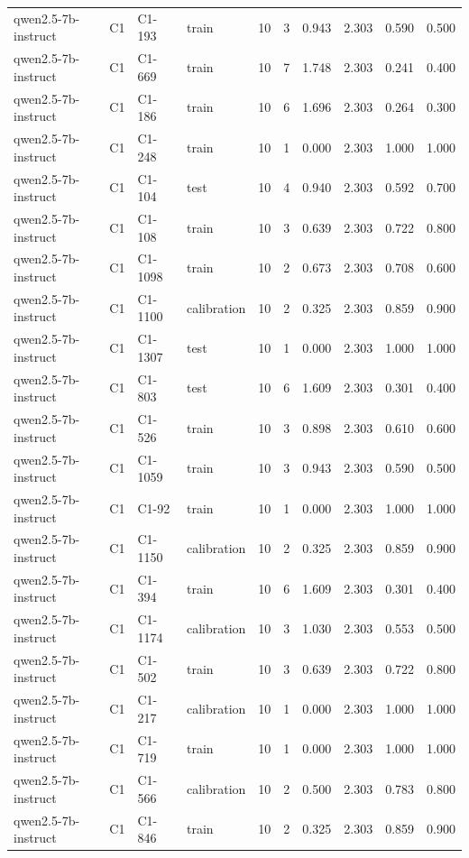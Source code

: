 \begin{table}
\begin{tabular}{llllrrrrrr}
qwen2.5-7b-instruct & C1 & C1-193 & train & 10 & 3 & 0.943 & 2.303 & 0.590 & 0.500 \\
qwen2.5-7b-instruct & C1 & C1-669 & train & 10 & 7 & 1.748 & 2.303 & 0.241 & 0.400 \\
qwen2.5-7b-instruct & C1 & C1-186 & train & 10 & 6 & 1.696 & 2.303 & 0.264 & 0.300 \\
qwen2.5-7b-instruct & C1 & C1-248 & train & 10 & 1 & 0.000 & 2.303 & 1.000 & 1.000 \\
qwen2.5-7b-instruct & C1 & C1-104 & test & 10 & 4 & 0.940 & 2.303 & 0.592 & 0.700 \\
qwen2.5-7b-instruct & C1 & C1-108 & train & 10 & 3 & 0.639 & 2.303 & 0.722 & 0.800 \\
qwen2.5-7b-instruct & C1 & C1-1098 & train & 10 & 2 & 0.673 & 2.303 & 0.708 & 0.600 \\
qwen2.5-7b-instruct & C1 & C1-1100 & calibration & 10 & 2 & 0.325 & 2.303 & 0.859 & 0.900 \\
qwen2.5-7b-instruct & C1 & C1-1307 & test & 10 & 1 & 0.000 & 2.303 & 1.000 & 1.000 \\
qwen2.5-7b-instruct & C1 & C1-803 & test & 10 & 6 & 1.609 & 2.303 & 0.301 & 0.400 \\
qwen2.5-7b-instruct & C1 & C1-526 & train & 10 & 3 & 0.898 & 2.303 & 0.610 & 0.600 \\
qwen2.5-7b-instruct & C1 & C1-1059 & train & 10 & 3 & 0.943 & 2.303 & 0.590 & 0.500 \\
qwen2.5-7b-instruct & C1 & C1-92 & train & 10 & 1 & 0.000 & 2.303 & 1.000 & 1.000 \\
qwen2.5-7b-instruct & C1 & C1-1150 & calibration & 10 & 2 & 0.325 & 2.303 & 0.859 & 0.900 \\
qwen2.5-7b-instruct & C1 & C1-394 & train & 10 & 6 & 1.609 & 2.303 & 0.301 & 0.400 \\
qwen2.5-7b-instruct & C1 & C1-1174 & calibration & 10 & 3 & 1.030 & 2.303 & 0.553 & 0.500 \\
qwen2.5-7b-instruct & C1 & C1-502 & train & 10 & 3 & 0.639 & 2.303 & 0.722 & 0.800 \\
qwen2.5-7b-instruct & C1 & C1-217 & calibration & 10 & 1 & 0.000 & 2.303 & 1.000 & 1.000 \\
qwen2.5-7b-instruct & C1 & C1-719 & train & 10 & 1 & 0.000 & 2.303 & 1.000 & 1.000 \\
qwen2.5-7b-instruct & C1 & C1-566 & calibration & 10 & 2 & 0.500 & 2.303 & 0.783 & 0.800 \\
qwen2.5-7b-instruct & C1 & C1-846 & train & 10 & 2 & 0.325 & 2.303 & 0.859 & 0.900 \\

\end{tabular}
\end{table}
